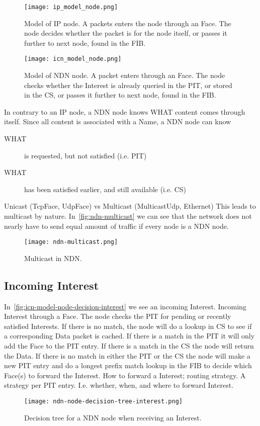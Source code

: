 \begin{figure}[H]
  \centering
  \texttt{[image: ip\_model\_node.png]}
  \caption{Model of \gls{IP} node. A packets enters the node through an Face. 
  The node decides whether the packet is for the node itself, or passes it further to next node, found in the \gls{FIB}.}
  \label{fig:ip-model-node}
\end{figure}

\begin{figure}[H]
  \centering
  \texttt{[image: icn\_model\_node.png]}
  \caption{Model of \gls{NDN} node. A packet enters through an Face. 
  The node checks whether the Interest is already queried in the \gls{PIT}, or stored in the \gls{CS}, or passes it further to next node, found in the \gls{FIB}.}
  \label{fig:icn-model-node}
\end{figure}

In contrary to an \gls{IP} node, a \gls{NDN} node knows WHAT content comes through itself. 
Since all content is associated with a Name, a \gls{NDN} node can know 
\begin{description}
  \item[WHAT] is requested, but not satisfied (i.e. \gls{PIT})
  \item[WHAT] has been satisfied earlier, and still available (i.e. \gls{CS})
\end{description}

Unicast (TcpFace, UdpFace) vs Multicast (MulticastUdp, Ethernet)
This leads to multicast by nature.
In~\autoref{fig:ndn-multicast} we can see that the network does not nearly have to send equal amount of traffic if every node is a \gls{NDN} node.
\begin{figure}[H]
  \centering
  \texttt{[image: ndn-multicast.png]}
  \caption{Multicast in NDN.}
  \label{fig:ndn-multicast}
\end{figure}
 
\subsection{Incoming Interest}\label{incoming-interest}
In~\autoref{fig:icn-model-node-decision-interest} we see an incoming Interest.
Incoming Interest through a Face. The node checks the \gls{PIT} for pending or recently satisfied Interests. 
If there is no match, the node will do a lookup in \gls{CS} to see if a corresponding Data packet is cached. 
If there is a match in the \gls{PIT} it will only add the Face to the \gls{PIT} entry. If there is a match in the \gls{CS} the node will return the Data. 
If there is no match in either the \gls{PIT} or the \gls{CS} the node will make a new \gls{PIT} entry and do a longest prefix match lookup in the \gls{FIB} to decide which Face(s) to forward the Interest. 
How to forward a Interest; routing strategy. 
A strategy per \gls{PIT} entry. 
I.e. whether, when, and where to forward Interest.
\begin{figure}[H]
  \centering
  \texttt{[image: ndn-node-decision-tree-interest.png]}
  \caption{Decision tree for a \gls{NDN} node when receiving an Interest.}
  \label{fig:icn-model-node-decision-interest}
\end{figure}

